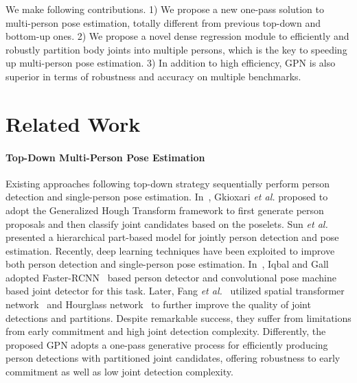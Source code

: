 \documentclass[10pt,twocolumn,letterpaper]{article}
\begin{document}
We make following contributions.
1) We propose a new one-pass solution to multi-person pose estimation, totally different from previous top-down and bottom-up ones.
2) We propose a novel dense regression module to efficiently and robustly partition body joints into multiple persons, which is the key to speeding up multi-person pose estimation.
3) In addition to high efficiency,  GPN is also superior in terms of robustness and accuracy on multiple benchmarks.


\section{Related Work}

\vspace{-2mm}
\paragraph{Top-Down Multi-Person Pose Estimation}
Existing approaches following top-down strategy sequentially perform person detection and
single-person pose estimation. In~\cite{gkioxari2014using}, Gkioxari \emph{et al.} proposed to adopt the Generalized Hough Transform framework to first generate person proposals and then classify joint candidates based on the poselets. Sun \emph{et al.}~\cite{sun2011articulated} presented a hierarchical part-based model for jointly person detection and pose estimation. Recently, deep learning
techniques have been exploited to improve both person detection and single-person pose estimation. In~\cite{iqbal2016multi}, Iqbal and Gall adopted Faster-RCNN~\cite{ren2015faster} based person detector
and convolutional pose machine~\cite{hpe:conv_pose_machine_arxiv16} based joint detector for this task. Later, Fang \emph{et al.}~\cite{fang16rmpe} utilized spatial transformer network~\cite{jaderberg2015spatial}
and Hourglass network~\cite{hpe:hourglass_arxiv15} to further improve the quality of joint detections and partitions. Despite remarkable success, they suffer from limitations
from early commitment and  high joint detection complexity. Differently, the proposed GPN adopts a one-pass generative process for efficiently producing person detections with partitioned joint candidates, offering robustness to  early commitment as well as low joint detection complexity.

\vspace{-4mm}
\end{document}
